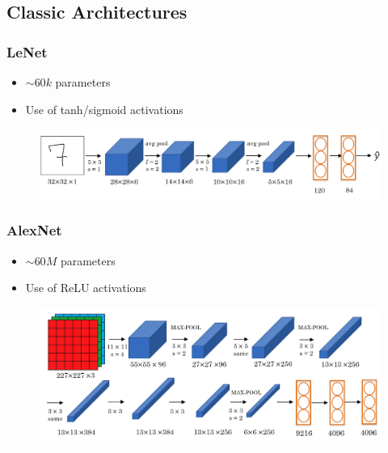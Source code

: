 \documentclass[10pt,a4paper]{article}
\newcommand{\props}{$\circ$}
\newcommand{\iprops}{\item[\props]}
\begin{document}
\subsection{Classic Architectures}
\subsubsection{LeNet}
\begin{itemize}
	\iprops $\sim 60k$ parameters
	\iprops Use of tanh/sigmoid activations
\end{itemize}
\begin{figure}[H]
	\includegraphics[width=\columnwidth]{figures/lenet.png}
\end{figure}

\subsubsection{AlexNet}
\begin{itemize}
	\iprops $\sim 60M$ parameters
	\iprops Use of ReLU activations
\end{itemize}
\begin{figure}[H]
	\includegraphics[width=\columnwidth]{figures/alexnet.png}
\end{figure}
\end{document}
